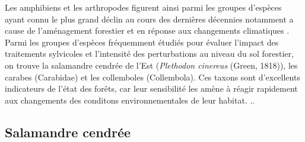 Les amphibiens et les arthropodes figurent ainsi parmi les groupes d'espèces ayant connu le plus grand déclin au cours des dernières décennies notamment a cause de l'aménagement forestier et en réponse aux changements climatiques \citep{Houlahan2000Quantitativeevidence,Stuart2004Statustrends,Warren2018projectedeffect,Wagner2021Insectdecline}. 
Parmi les groupes d'espèces fréquemment étudiés pour évaluer l'impact des traitements sylvicoles et l'intensité des perturbations au niveau du sol forestier, on trouve la salamandre cendrée de l'Est (\textit{Plethodon cinereus} (Green, 1818)), les carabes (Carabidae) et les collemboles (Collembola). 
Ces taxons sont d'excellents indicateurs de l'état des forêts, car leur sensibilité les amène à réagir rapidement aux changements des conditons environnementales de leur habitat. \citep{pongeVerticalDistributionCollembola2000,birdChangesSoilLitter2004,Maleque2009Arthropodsbioindicators}..

\subsection*{Salamandre cendrée}

